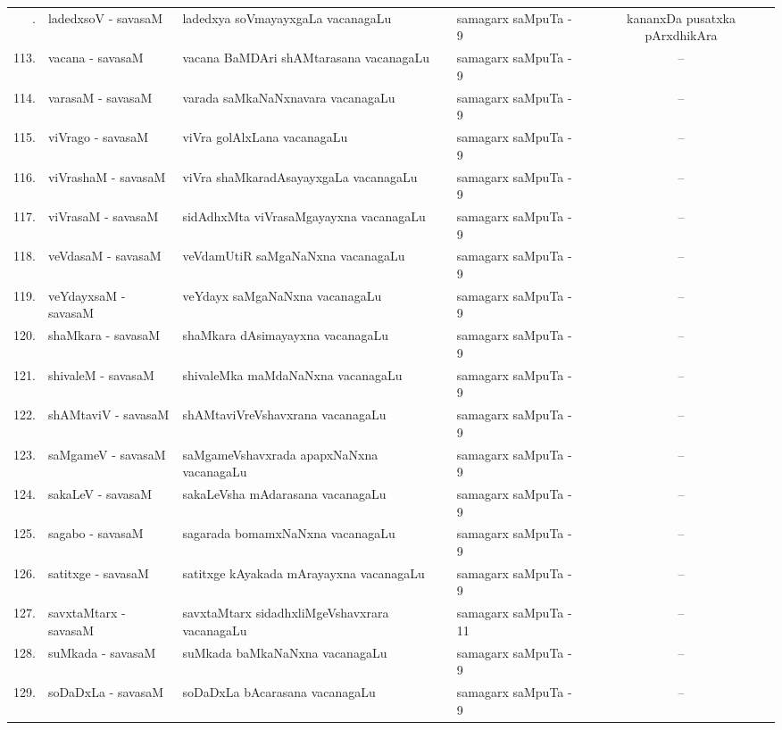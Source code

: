 {\renewcommand{\arraystretch}{1.3}
\begin{longtable}{rl>{\raggedright}p{5.5cm}lc}
\hline
\endfirsthead
\hline
\endhead
\hline
\endfoot
\endlastfoot
112. &  ladedxsoV - savasaM &  ladedxya soVmayayxgaLa vacanagaLu & samagarx saMpuTa - 9 & kananxDa pusatxka pArxdhikAra\\
113. &  vacana - savasaM & vacana BaMDAri shAMtarasana vacanagaLu & samagarx saMpuTa - 9 & --\\
114. &  varasaM - savasaM &  varada saMkaNaNxnavara vacanagaLu & samagarx saMpuTa - 9 & --\\
115. &  viVrago - savasaM &  viVra golAlxLana vacanagaLu & samagarx saMpuTa - 9 & --\\
116. & viVrashaM - savasaM &  viVra shaMkaradAsayayxgaLa vacanagaLu & samagarx saMpuTa - 9 & --\\
117. & viVrasaM - savasaM & sidAdhxMta viVrasaMgayayxna vacanagaLu & samagarx saMpuTa - 9 & --\\
118. & veVdasaM - savasaM &  veVdamUtiR saMgaNaNxna vacanagaLu & samagarx saMpuTa - 9 & --\\
119. & veYdayxsaM - savasaM &  veYdayx saMgaNaNxna vacanagaLu & samagarx saMpuTa - 9 & --\\
120. & shaMkara - savasaM &  shaMkara dAsimayayxna vacanagaLu & samagarx saMpuTa - 9 & --\\
121. & shivaleM - savasaM &  shivaleMka maMdaNaNxna vacanagaLu & samagarx saMpuTa - 9 & --\\
122. & shAMtaviV - savasaM & shAMtaviVreVshavxrana vacanagaLu & samagarx saMpuTa - 9 & --\\
123. & saMgameV - savasaM &  saMgameVshavxrada apapxNaNxna vacanagaLu & samagarx saMpuTa - 9 & --\\
124. & sakaLeV - savasaM & sakaLeVsha mAdarasana vacanagaLu & samagarx saMpuTa - 9 & --\\
125. & sagabo - savasaM & sagarada bomamxNaNxna vacanagaLu & samagarx saMpuTa - 9 & --\\
126. & satitxge - savasaM & satitxge kAyakada mArayayxna vacanagaLu & samagarx saMpuTa - 9 & --\\
127. & savxtaMtarx - savasaM &  savxtaMtarx sidadhxliMgeVshavxrara vacanagaLu & samagarx saMpuTa - 11 & --\\
128. & suMkada - savasaM & suMkada baMkaNaNxna vacanagaLu & samagarx saMpuTa - 9 & --\\
129. & soDaDxLa - savasaM &  soDaDxLa bAcarasana vacanagaLu & samagarx saMpuTa - 9 & --\\

\end{longtable}}
